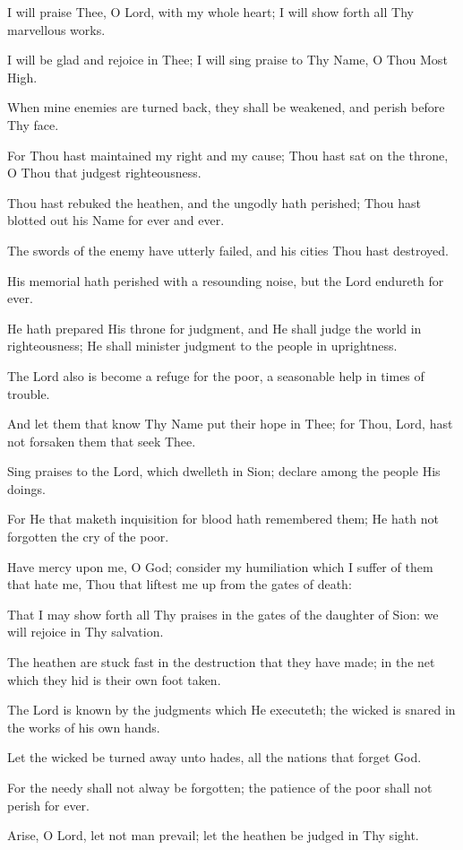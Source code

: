 I will praise Thee, O Lord, with my whole heart; I will show forth all Thy marvellous works.

I will be glad and rejoice in Thee; I will sing praise to Thy Name, O Thou Most High.

When mine enemies are turned back, they shall be weakened, and perish before Thy face.

For Thou hast maintained my right and my cause; Thou hast sat on the throne, O Thou that judgest righteousness.

Thou hast rebuked the heathen, and the ungodly hath perished; Thou hast blotted out his Name for ever and ever.

The swords of the enemy have utterly failed, and his cities Thou hast destroyed.

His memorial hath perished with a resounding noise, but the Lord endureth for ever.

He hath prepared His throne for judgment, and He shall judge the world in righteousness; He shall minister judgment to the people in uprightness.

The Lord also is become a refuge for the poor, a seasonable help in times of trouble.

And let them that know Thy Name put their hope in Thee; for Thou, Lord, hast not forsaken them that seek Thee.

Sing praises to the Lord, which dwelleth in Sion; declare among the people His doings.

For He that maketh inquisition for blood hath remembered them; He hath not forgotten the cry of the poor.

Have mercy upon me, O God; consider my humiliation which I suffer of them that hate me, Thou that liftest me up from the gates of death:

That I may show forth all Thy praises in the gates of the daughter of Sion: we will rejoice in Thy salvation.

The heathen are stuck fast in the destruction that they have made; in the net which they hid is their own foot taken.

The Lord is known by the judgments which He executeth; the wicked is snared in the works of his own hands.

Let the wicked be turned away unto hades, all the nations that forget God.

For the needy shall not alway be forgotten; the patience of the poor shall not perish for ever.

Arise, O Lord, let not man prevail; let the heathen be judged in Thy sight.

